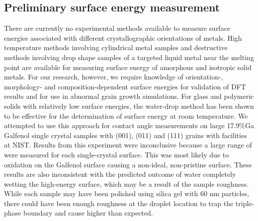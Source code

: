 \subsection{Preliminary surface energy measurement}
There are currently no experimental methods available to measure surface energies associated with different crystallographic orientations of metals. High temperature methods involving cylindrical metal samples and destructive methods involving drop shape samples of a targeted liquid metal near the melting point are available for measuring surface energy of amorphous and isotropic solid metals.\cite{Egry2010,Aqra2011,Cao2011} For our research, however, we require knowledge of orientation-, morphology- and composition-dependent surface energies for validation of DFT results and for use in abnormal grain growth simulations. For glass and polymeric solids with relatively low surface energies, the water-drop method has been shown to be effective for the determination of surface energy at room temperature.\cite{Ahadian2010,Kwok2000,Tavana2005} We attempted to use this approach for contact angle measurements on large 17.9$\%$Ga Galfenol single crystal samples with \hkl(001), \hkl(011) and \hkl(111) grains with facilities at NIST. Results from this experiment were inconclusive because a large range of \ca[s] were measured for each single-crystal surface. This was most likely due to oxidation on the Galfenol surface causing a non-ideal, non-pristine surface. These results are also inconsistent with the predicted outcome of water completely wetting the high-energy surface, which may be a result of the sample roughness. While each sample may have been polished using silica gel with 60 nm particles,\cite{Costa2016} there could have been enough roughness at the droplet location to trap the triple-phase boundary and cause higher \ca[s] than expected. 




